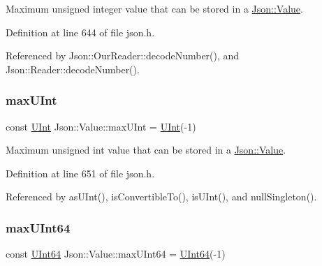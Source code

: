 Maximum unsigned integer value that can be stored in a \hyperlink{class_json_1_1_value}{Json\+::\+Value}. 



Definition at line 644 of file json.\+h.



Referenced by Json\+::\+Our\+Reader\+::decode\+Number(), and Json\+::\+Reader\+::decode\+Number().

\mbox{\label{class_json_1_1_value_ac79e63ee68d3aa914bfd6988be669b87}} 
\subsubsection{\texorpdfstring{max\+U\+Int}{maxUInt}}
{\footnotesize\ttfamily const \hyperlink{class_json_1_1_value_a0933d59b45793ae4aade1757c322a98d}{U\+Int} Json\+::\+Value\+::max\+U\+Int = \hyperlink{class_json_1_1_value_a0933d59b45793ae4aade1757c322a98d}{U\+Int}(-\/1)\hspace{0.3cm}{\ttfamily [static]}}



Maximum unsigned int value that can be stored in a \hyperlink{class_json_1_1_value}{Json\+::\+Value}. 



Definition at line 651 of file json.\+h.



Referenced by as\+U\+Int(), is\+Convertible\+To(), is\+U\+Int(), and null\+Singleton().

\mbox{\label{class_json_1_1_value_ae1eb89c305c39516696ff305cffa01da}} 
\subsubsection{\texorpdfstring{max\+U\+Int64}{maxUInt64}}
{\footnotesize\ttfamily const \hyperlink{class_json_1_1_value_a8b62564be8c087c6d18de180ff4e13e3}{U\+Int64} Json\+::\+Value\+::max\+U\+Int64 = \hyperlink{class_json_1_1_value_a8b62564be8c087c6d18de180ff4e13e3}{U\+Int64}(-\/1)\hspace{0.3cm}{\ttfamily [static]}}



